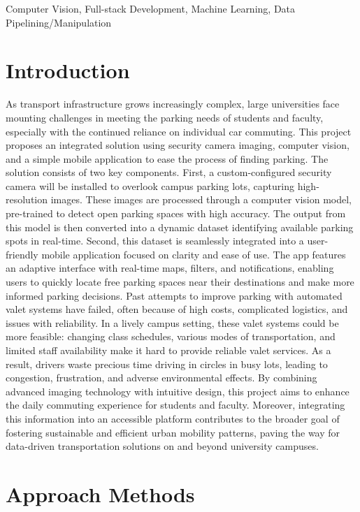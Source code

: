\documentclass[conference]{IEEEtran}
\begin{document}
\begin{IEEEkeywords}
    Computer Vision, Full-stack Development, Machine Learning, Data Pipelining/Manipulation
\end{IEEEkeywords}

\section{Introduction}
As transport infrastructure grows increasingly complex, 
large universities face mounting challenges in meeting the parking needs of students and faculty, 
especially with the continued reliance on individual car commuting. 
This project proposes an integrated solution using security camera imaging, 
computer vision, 
and a simple mobile application to ease the process of finding parking. 
The solution consists of two key components. 
First, 
a custom-configured security camera will be installed to overlook campus parking lots,
capturing high-resolution images. 
These images are processed through a computer vision model, 
pre-trained to detect open parking spaces with high accuracy. 
The output from this model is then converted into a dynamic dataset identifying available parking spots in real-time. 
Second, 
this dataset is seamlessly integrated into a user-friendly mobile application focused on clarity and ease of use. 
The app features an adaptive interface with real-time maps, 
filters, 
and notifications, 
enabling users to quickly locate free parking spaces near their destinations and make more informed parking decisions. 
Past attempts to improve parking with automated valet systems have failed, 
often because of high costs, 
complicated logistics, 
and issues with reliability. 
In a lively campus setting, 
these valet systems could be more feasible: 
changing class schedules, 
various modes of transportation, 
and limited staff availability make it hard to provide reliable valet services. 
As a result, 
drivers waste precious time driving in circles in busy lots, 
leading to congestion, 
frustration, 
and adverse environmental effects. 
By combining advanced imaging technology with intuitive design, 
this project aims to enhance the daily commuting experience for students and faculty. 
Moreover, 
integrating this information into an accessible platform contributes to the broader goal of fostering sustainable and efficient urban mobility patterns, 
paving the way for data-driven transportation solutions on and beyond university campuses.

\section{Approach Methods}
\end{document}
